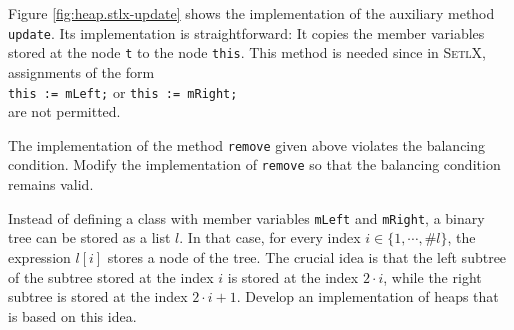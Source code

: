 \noindent 
Figure \ref{fig:heap.stlx-update} shows the implementation of the auxiliary method \texttt{update}.
Its implementation is straightforward: It copies the member variables stored at the node \texttt{t}
to the node \texttt{this}.  This method is needed since in \textsc{SetlX}, assignments of the form
\\[0.2cm]
\hspace*{1.3cm}
\texttt{this := mLeft;} \quad or \quad \texttt{this := mRight;}
\\[0.2cm]
are not permitted.
\pagebreak

\exercise
The implementation of the method \texttt{remove} given above violates the balancing condition.
Modify the implementation of \texttt{remove} so that the balancing condition remains valid.

\exercise
Instead of defining a class with member variables \texttt{mLeft} and \texttt{mRight}, a binary tree
can be stored as a list $l$.  In that case, for every index $i \in \{1, \cdots, \mathtt{\#}l \}$,
the expression $l[i]$ stores a node of the tree.  The crucial idea is that the left subtree of the
subtree stored at the index $i$ is stored at the index $2 \cdot i$, while the right subtree is
stored at the index $2 \cdot i + 1$.  Develop an implementation of heaps that is based on this idea.

